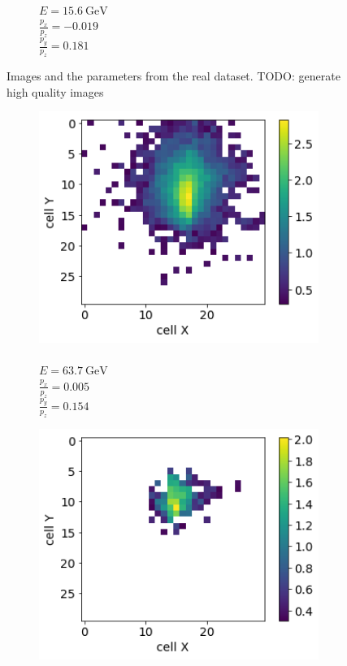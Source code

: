 \documentclass{webofc}
\newcommand{\todo}[1]{{\color{blue}TODO: #1}}
\begin{document}
\begin{figure}
\begin{subfigure}{0.24\textwidth}
    \caption{\\$E = 15.6~\text{GeV}$ \\  $\frac{p_x}{p_z}=-0.019$ \\ $\frac{p_y}{p_z}=0.181$}\label{fig:real-imgs-4}
  \end{subfigure}
  \caption{Images and the parameters from the real dataset. \todo{generate high quality images}}
  \label{fig:real-imgs}
\end{figure}


\begin{figure}
\captionsetup[subfigure]{justification=centering}
  \centering
  \begin{subfigure}{0.24\textwidth}
    \centering
    \includegraphics[width=1\textwidth]{figures/1_gen.png}
    \caption{\\$E = 63.7~\text{GeV}$ \\ $\frac{p_x}{p_z}=0.005$ \\ $\frac{p_y}{p_z}=0.154$}\label{fig:gen-imgs-1}
  \end{subfigure}
  \begin{subfigure}{0.24\textwidth}
    \centering
    \includegraphics[width=1\textwidth]{figures/2_gen.png}

\end{subfigure}
\end{figure}
\end{document}
